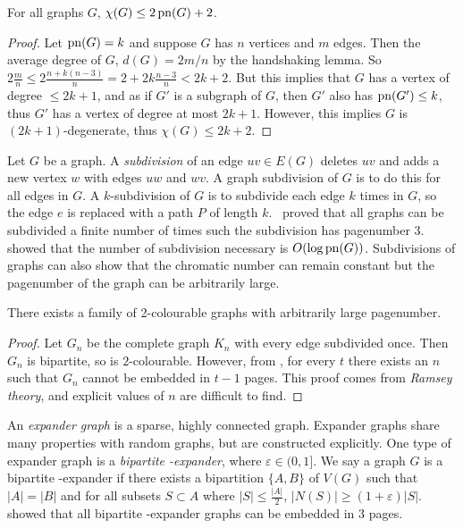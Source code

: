 \begin{proposition}\label{thm:Colouring_Bound}
	For all graphs \(G\), \(\chi(G) \leq 2 \operatorname{pn}(G) + 2\).
\end{proposition}
\begin{proof}
	Let \(\operatorname{pn}(G) = k\) and suppose \(G\) has \(n\) vertices and \(m\) edges. Then the average degree of \(G\), \(d(G) = 2m/n\) by the handshaking lemma. So \(2\frac{m}{n} \leq 2 \frac{n + k(n-3)}{n} = 2 + 2k \frac{n-3}{n} < 2k + 2\). But this implies that \(G\) has a vertex of degree \(\leq 2k + 1\), and as if \(G'\) is a subgraph of \(G\), then \(G'\) also has \(\operatorname{pn}(G') \leq k\), thus \(G'\) has a vertex of degree at most \(2k + 1\). However, this implies \(G\) is \((2k + 1)\)-degenerate, thus \(\chi(G) \leq 2k + 2\).
\end{proof}

Let $G$ be a graph. A \textit{subdivision} of an edge $uv \in E(G)$ deletes $uv$ and adds a new vertex $w$ with edges $uw$ and $wv$. A graph subdivision of $G$ is to do this for all edges in $G$. A $k$-subdivision of $G$ is to subdivide each edge $k$ times in $G$, so the edge $e$ is replaced with a path $P$ of length $k$.\ \textcite{atneosenEmbeddabilityCompactaNbooks} proved that all graphs can be subdivided a finite number of times such the subdivision has pagenumber 3.\ \textcite{dujmovicLayoutsGraphSubdivisions2005} showed that the number of subdivision necessary is $O(\log\operatorname{pn}(G))$. Subdivisions of graphs can also show that the chromatic number can remain constant but the pagenumber of the graph can be arbitrarily large.

\begin{theorem}
	There exists a family of 2-colourable graphs with arbitrarily large pagenumber.
\end{theorem}
\begin{proof}
	Let $G_n$ be the complete graph $K_n$ with every edge subdivided once. Then $G_n$ is bipartite, so is $2$-colourable. However, from \textcite{eppsteinSeparatingThicknessGeometric2002}, for every $t$ there exists an $n$ such that $G_n$ cannot be embedded in $t-1$ pages. This proof comes from \textit{Ramsey theory}, and explicit values of $n$ are difficult to find. 
\end{proof}

An \textit{expander graph} is a sparse, highly connected graph. Expander graphs share many properties with random graphs, but are constructed explicitly. One type of expander graph is a \textit{bipartite \varepsilon-expander}, where $\varepsilon \in (0, 1]$. We say a graph $G$ is a bipartite \varepsilon-expander if there exists a bipartition $ \{A, B\}$ of $V(G)$ such that $|A| = |B|$ and for all subsets $S \subset A$ where $|S| \leq \frac{|A|}{2}$, $|N(S)| \geq (1 + \varepsilon) |S|$. 
\textcite{dujmovicLayoutsExpanderGraphs2016} showed that all bipartite \varepsilon-expander graphs can be embedded in 3 pages. 


